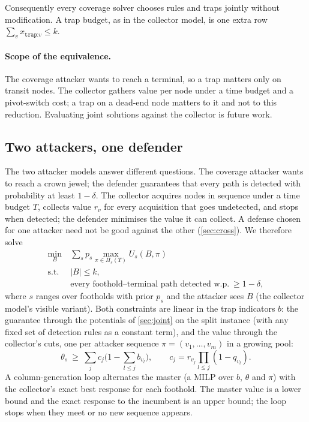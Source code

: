 \documentclass[10pt,twocolumn]{article}
\begin{document}
Consequently every coverage solver chooses rules and traps jointly without modification. A
trap budget, as in the collector model, is one extra row $\sum_v x_{\texttt{trap:}v}\le k$.

\paragraph{Scope of the equivalence.} The coverage attacker wants to reach a terminal, so a
trap matters only on transit nodes. The collector gathers value per node under a time
budget and a pivot-switch cost; a trap on a dead-end node matters to it and not to this
reduction. Evaluating joint solutions against the collector is future work.

\subsection{Two attackers, one defender}\label{sec:combined}

The two attacker models answer different questions. The coverage attacker wants to reach a
crown jewel; the defender guarantees that every path is detected with probability at least
$1-\delta$. The collector acquires nodes in sequence under a time budget $T$, collects
value $r_v$ for every acquisition that goes undetected, and stops when detected; the defender
minimises the value it can collect. A defense chosen for one attacker need not be good against
the other (\cref{sec:cross}). We therefore solve
\begin{align*}
\min_{B}\ & \textstyle\sum_{s} p_s \max_{\pi\in\Pi_s(T)} U_s(B,\pi)\\
\text{s.t. } & |B|\le k,\\
& \text{every foothold--terminal path detected w.p.}\ \ge 1-\delta,
\end{align*}
where $s$ ranges over footholds with prior $p_s$ and the attacker sees $B$ (the collector model's visible
variant). Both constraints are linear in the trap indicators $b$: the guarantee through the
potentials of \cref{sec:joint} on the split instance (with any fixed set of detection rules as a
constant term), and the value through the collector's cuts, one per attacker sequence
$\pi=(v_1,\dots,v_m)$ in a growing pool:
\[
\theta_s\ \ge\ \textstyle\sum_{j} c_j\bigl(1-\sum_{l\le j} b_{v_l}\bigr),\qquad
c_j = r_{v_j}\prod_{l\le j}(1-q_{v_l}).
\]
A column-generation loop alternates the master (a MILP over $b$, $\theta$ and $\pi$) with
the collector's exact best response for each foothold. The master value is a lower bound and the
exact response to the incumbent is an upper bound; the loop stops when they meet or no new
sequence appears.
\end{document}
